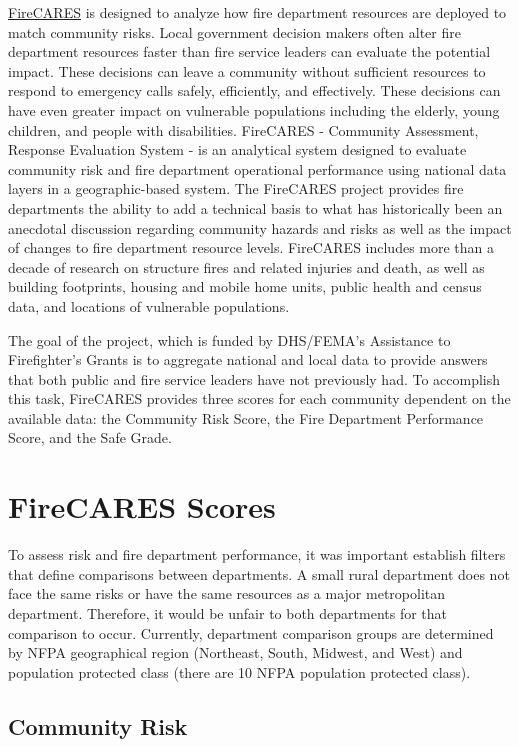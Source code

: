 \documentclass[12pt,oneside]{book}
\begin{document}
\href{https://firecares.org}{FireCARES} is designed to analyze how fire department resources are deployed to match community risks. Local government decision makers often alter fire department resources faster than fire service leaders can evaluate the potential impact. These decisions can leave a community without sufficient resources to respond to emergency calls safely, efficiently, and effectively. These decisions can have even greater impact on vulnerable populations including the elderly, young children, and people with disabilities. FireCARES - Community Assessment, Response Evaluation System - is an analytical system designed to evaluate community risk and fire department operational performance using national data layers in a geographic-based system. The FireCARES project provides fire departments the ability to add a technical basis to what has historically been an anecdotal discussion regarding community hazards and risks as well as the impact of changes to fire department resource levels. FireCARES includes more than a decade of research on structure fires and related injuries and death, as well as building footprints, housing and mobile home units, public health and census data, and locations of vulnerable populations.

The goal of the project, which is funded by DHS/FEMA's Assistance to Firefighter's Grants is to aggregate national and local data to provide answers that both public and fire service leaders have not previously had. To accomplish this task, FireCARES provides three scores for each community dependent on the available data: the Community Risk Score, the Fire Department Performance Score, and the Safe Grade.

\chapter{FireCARES Scores}

To assess risk and fire department performance, it was important establish filters that define comparisons between departments. A small rural department does not face the same risks or have the same resources as a major metropolitan department. Therefore, it would be unfair to both departments for that comparison to occur. Currently, department comparison groups are determined by NFPA geographical region (Northeast, South, Midwest, and West) and population protected class (there are 10 NFPA population protected class).

\section{Community Risk}
\end{document}
